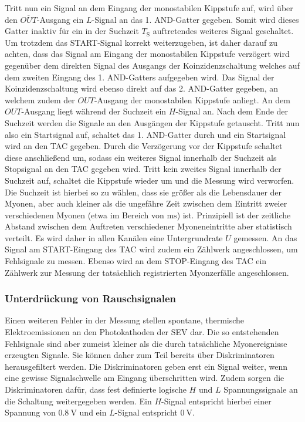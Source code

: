 Tritt nun ein Signal an dem Eingang der monostabilen Kippstufe auf, wird über den $\overline{OUT}$-Ausgang ein $L$-Signal an das 1. AND-Gatter gegeben. Somit wird dieses Gatter inaktiv für ein in der Suchzeit $T_{\mathrm{S}}$ auftretendes weiteres Signal geschaltet. Um trotzdem das START-Signal korrekt weiterzugeben, ist daher darauf zu achten, dass das Signal am Eingang der monostabilen Kippstufe verzögert wird gegenüber dem direkten Signal des Ausgangs der Koinzidenzschaltung welches auf dem zweiten Eingang des 1. AND-Gatters aufgegeben wird.
Das Signal der Koinzidenzschaltung wird ebenso direkt auf das 2. AND-Gatter gegeben, an welchem zudem der $OUT$-Ausgang der monostabilen Kippstufe anliegt. An dem $OUT$-Ausgang liegt während der Suchzeit ein $H$-Signal an.
Nach dem Ende der Suchzeit werden die Signale an den Ausgängen der Kippstufe getauscht.
Tritt nun also ein Startsignal auf, schaltet das 1. AND-Gatter durch und ein Startsignal wird an den TAC gegeben. Durch die Verzögerung vor der Kippstufe schaltet diese anschließend um, sodass ein weiteres Signal innerhalb der Suchzeit als Stopsignal an den TAC gegeben wird.
Tritt kein zweites Signal innerhalb der Suchzeit auf, schaltet die Kippstufe wieder um und die Messung wird verworfen.
Die Suchzeit ist hierbei so zu wählen, dass sie größer als die Lebensdauer der Myonen, aber auch kleiner als die ungefähre Zeit zwischen dem Eintritt zweier verschiedenen Myonen (etwa im Bereich von $\si{\milli\second}$) ist.
Prinzipiell ist der zeitliche Abstand zwischen dem Auftreten verschiedener Myoneneintritte aber statistisch verteilt. Es wird daher in allen Kanälen eine Untergrundrate $U$ gemessen.
An das Signal am START-Eingang des TAC wird zudem ein Zählwerk angeschlossen, um Fehlsignale zu messen.
Ebenso wird an dem STOP-Eingang des TAC ein Zählwerk zur Messung der tatsächlich registrierten Myonzerfälle angeschlossen.
\subsubsection{Unterdrückung von Rauschsignalen}
Einen weiteren Fehler in der Messung stellen spontane, thermische Elektroemissionen an den Photokathoden der SEV dar.
Die so entstehenden Fehlsignale sind aber zumeist kleiner als die durch tatsächliche Myonereignisse erzeugten Signale.
Sie können daher zum Teil bereits über Diskriminatoren herausgefiltert werden.
Die Diskriminatoren geben erst ein Signal weiter, wenn eine gewisse Signalschwelle am Eingang überschritten wird. Zudem sorgen die Diskriminatoren dafür, dass fest definierte logische $H$ und $L$ Spannungssignale an die Schaltung weitergegeben werden. Ein $H$-Signal entspricht hierbei einer Spannung von $\SI{0.8}{\volt}$ und ein $L$-Signal entspricht $\SI{0}{\volt}$.

